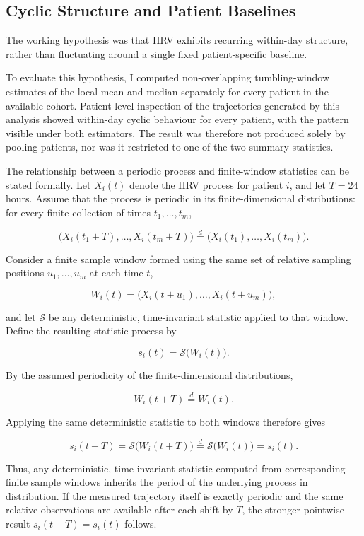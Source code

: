 \documentclass[11pt,a4paper]{article}
\begin{document}
\subsection{Cyclic Structure and Patient Baselines}

The working hypothesis was that HRV exhibits recurring within-day structure,
rather than fluctuating around a single fixed patient-specific baseline.

To evaluate this hypothesis, I computed non-overlapping tumbling-window
estimates of the local mean and median separately for every patient in the
available cohort. Patient-level inspection of the trajectories generated by
this analysis showed within-day cyclic behaviour for every patient, with the
pattern visible under both estimators. The result was therefore not produced
solely by pooling patients, nor was it restricted to one of the two summary
statistics.

The relationship between a periodic process and finite-window statistics can
be stated formally. Let $X_i(t)$ denote the HRV process for patient $i$, and
let $T=24$ hours. Assume that the process is periodic in its
finite-dimensional distributions: for every finite collection of times
$t_1,\ldots,t_m$,

\[
\bigl(X_i(t_1+T),\ldots,X_i(t_m+T)\bigr)
\overset{d}{=}
\bigl(X_i(t_1),\ldots,X_i(t_m)\bigr).
\]

Consider a finite sample window formed using the same set of relative sampling
positions $u_1,\ldots,u_m$ at each time $t$,

\[
W_i(t)
=
\bigl(X_i(t+u_1),\ldots,X_i(t+u_m)\bigr),
\]

and let $\mathcal{S}$ be any deterministic, time-invariant statistic applied
to that window. Define the resulting statistic process by

\[
s_i(t)=\mathcal{S}\bigl(W_i(t)\bigr).
\]

By the assumed periodicity of the finite-dimensional distributions,

\[
W_i(t+T)\overset{d}{=}W_i(t).
\]

Applying the same deterministic statistic to both windows therefore gives

\[
s_i(t+T)
=
\mathcal{S}\bigl(W_i(t+T)\bigr)
\overset{d}{=}
\mathcal{S}\bigl(W_i(t)\bigr)
=
s_i(t).
\]

Thus, any deterministic, time-invariant statistic computed from corresponding
finite sample windows inherits the period of the underlying process in
distribution. If the measured trajectory itself is exactly periodic and the
same relative observations are available after each shift by $T$, the stronger
pointwise result $s_i(t+T)=s_i(t)$ follows.
\end{document}
